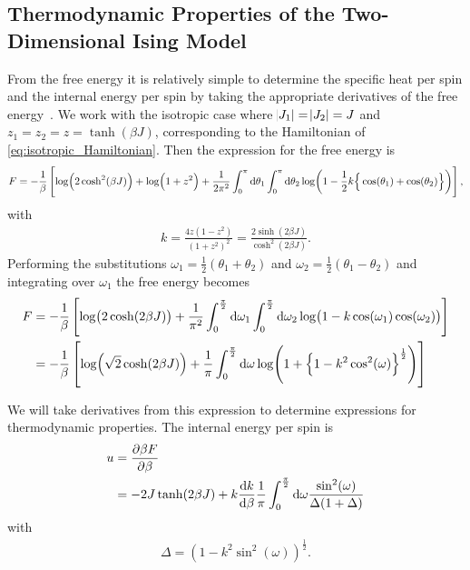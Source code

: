 \documentclass[11pt, a4paper]{report} %
\begin{document}
\subsection{Thermodynamic Properties of the Two-Dimensional Ising Model}
From the free energy it is relatively simple to determine the specific heat per spin and the internal energy per spin by taking the appropriate derivatives of the free energy~\cite{mccoy:1973}. We work with the isotropic case where \(\abs{J_1} = \abs{J_2} = J\) and \(z_1 = z_2 = z = \tanh(\beta J)\), corresponding to the Hamiltonian of \cref{eq:isotropic_Hamiltonian}.
Then the expression for the free energy is
\begin{dmath}
	F = -\frac{1}{\beta} \left[\log(2\cosh^2(\beta J)) + \log(1+z^2) + \frac{1}{2\pi^2} \int_0^{\pi}\dif \theta_1 \int_0^{\pi} \dif \theta_2 \log(1-\frac{1}{2}k \Big\{\cos(\theta_1) + \cos(\theta_2)\Big\})\right],
\end{dmath}
with
\begin{align}
	\label{eq:elliptic_argument}
	k = \frac{4z(1-z^2)}{(1+z^2)^2} = \frac{2\sinh(2\beta J)}{\cosh^2{(2\beta J)}}.
\end{align}
Performing the substitutions \(\omega_1 = \frac{1}{2}(\theta_1 + \theta_2)\) and \(\omega_2 = \frac{1}{2}(\theta_1 - \theta_2)\) and integrating over \(\omega_1\) the free energy becomes
\begin{align}
		F &= -\frac{1}{\beta} \left[\log(2\cosh(2\beta J)) + \frac{1}{\pi^2} \int_0^{\frac{\pi}{2}} \dif \omega_1 \int_0^{\frac{\pi}{2}} \dif \omega_2 \log(1- k \cos(\omega_1)\cos(\omega_2))\right]\\
		&= -\frac{1}{\beta} \left[\log(\sqrt{2}\cosh(2\beta J)) + \frac{1}{\pi} \int_0^{\frac{\pi}{2}} \dif \omega \log(1+\left\{1-k^2 \cos^2(\omega)\right\}^{\frac{1}{2}}) \right]
\end{align}

We will take derivatives from this expression to determine expressions for thermodynamic properties. The internal energy per spin is
\begin{align}
	\label{eq:internal_energy}
	u &= \frac{\partial \beta F}{\partial \beta}\\
	&= -2 J \tanh(2\beta J) + k \frac{\dif k}{\dif \beta} \frac{1}{\pi} \int_0^{\frac{\pi}{2}} \dif \omega \frac{\sin^2(\omega)}{\Delta (1+\Delta)}
\end{align}
with
\begin{align}
	\Delta = \left( 1 - k^2 \sin^2(\omega) \right)^{\frac{1}{2}}.
\end{align}
\end{document}
